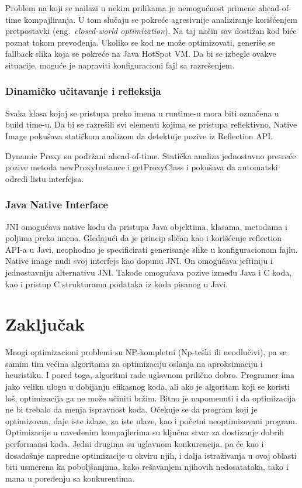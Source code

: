 \documentclass[a4paper]{article}
\begin{document}
Problem na koji se nailazi u nekim prilikama je nemogućnost 
primene ahead-of-time kompajliranja. U tom slučaju se pokreće 
agresivnije analiziranje korišćenjem pretpostavki (eng.~{\em closed-world optimization}). 
Na taj način sav dostižan kod biće poznat tokom prevođenja.
Ukoliko se kod ne može optimizovati, generiše se fallback slika
koja se pokreće na Java HotSpot VM. Da bi se izbegle ovakve situacije,
moguće je napraviti konfiguracioni fajl sa razrešenjem.

\subsubsection{Dinamičko učitavanje i refleksija}
\label{sec:natImg-dynRefl}
Svaka klasa kojoj se pristupa preko imena u runtime-u mora 
biti označena u build time-u.
Da bi se razrešili svi elementi kojima se pristupa reflektivno,
Native Image pokušava statičkom analizom da detektuje pozive 
iz Reflection API.

Dynamic Proxy su podržani ahead-of-time. Statička analiza 
jednostavno presreće pozive metoda newProxyInstance i 
getProxyClass i pokušava da automatski odredi listu interfejsa.

\subsubsection{Java Native Interface}
\label{sec:natImg-jni}
JNI omogućava native kodu da pristupa Java objektima, klasama,
metodama i poljima preko imena. Gledajući da je princip sličan
kao i korišćenje reflection API-a u Javi, neophodno je specificirati
generisanje slike u konfiguracionom fajlu.
Native image nudi svoj interfejs kao dopunu JNI.
On omogućava jeftiniju i jednostavniju alternativu JNI. Takođe
omogućava pozive između Java i C koda, kao i pristup C strukturama
podataka iz koda pisanog u Javi.



\section{Zaključak}
\label{sec:zakljucak}

Mnogi optimizacioni problemi su NP-kompletni (Np-teški ili neodlučivi), pa se samim tim većina algoritama za optimizaciju oslanja na aproksimaciju i heuristiku.  
I pored toga, algoritmi rade uglavnom prilično dobro. 
Programer ima jako veliku ulogu u dobijanju efikasnog koda, ali ako je algoritam koji se koristi loš, optimizacija ga ne može učiniti bržim. 
Bitno je napomenuti i da optimizacija ne bi trebalo da menja ispravnost koda. 
Očekuje se da program koji je optimizovan, daje iste izlaze, za iste ulaze, kao i početni neoptimizovani program.
Optimizacije u navedenim kompajlerima su ključna stvar za dostizanje dobrih performansi koda. 
Jedni drugima su uglavnom konkurencija, pa će kao i dosadašnje napredne optimizacije u okviru njih, i dalja istraživanja u ovoj 
oblasti biti usmerena ka poboljšanjima, kako rešavanjem njihovih nedosatataka, tako i mana u poređenju sa konkurentima.


\appendix
 

\end{document}
